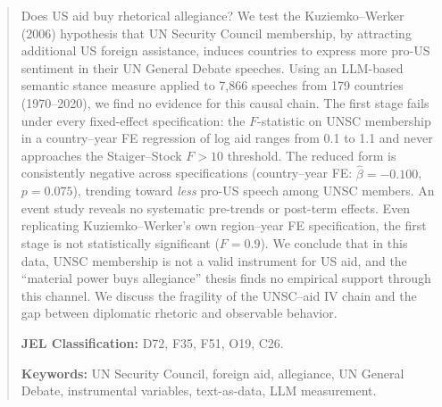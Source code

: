 \begin{abstract}
\noindent
Does US aid buy rhetorical allegiance? We test the Kuziemko--Werker (2006) hypothesis that UN Security Council membership, by attracting additional US foreign assistance, induces countries to express more pro-US sentiment in their UN General Debate speeches. Using an LLM-based semantic stance measure applied to 7,866 speeches from 179 countries (1970--2020), we find no evidence for this causal chain. The first stage fails under every fixed-effect specification: the $F$-statistic on UNSC membership in a country--year FE regression of log aid ranges from 0.1 to 1.1 and never approaches the Staiger--Stock $F>10$ threshold. The reduced form is consistently negative across specifications (country--year FE: $\hat{\beta} = -0.100$, $p=0.075$), trending toward \emph{less} pro-US speech among UNSC members. An event study reveals no systematic pre-trends or post-term effects. Even replicating Kuziemko--Werker's own region--year FE specification, the first stage is not statistically significant ($F=0.9$). We conclude that in this data, UNSC membership is not a valid instrument for US aid, and the ``material power buys allegiance'' thesis finds no empirical support through this channel. We discuss the fragility of the UNSC--aid IV chain and the gap between diplomatic rhetoric and observable behavior.

\vspace{1em}
\noindent\textbf{JEL Classification:} D72, F35, F51, O19, C26.

\noindent\textbf{Keywords:} UN Security Council, foreign aid, allegiance, UN General Debate, instrumental variables, text-as-data, LLM measurement.
\end{abstract}
